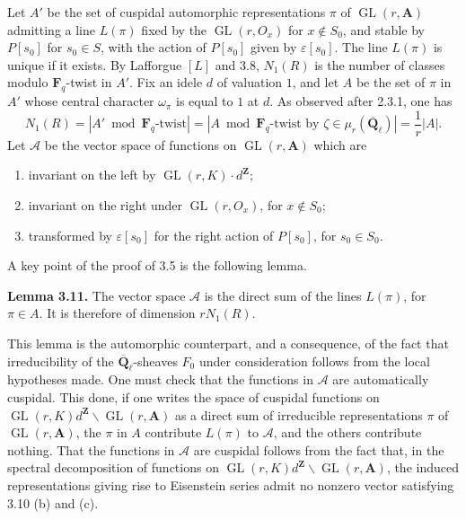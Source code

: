 \documentclass[11pt]{article}
\newcommand{\Qbar}{\overline{\mathbf Q}}
\newcommand{\Fq}{\mathbf F_q}
\newcommand{\Z}{\mathbf Z}
\newcommand{\A}{\mathbf A}
\newcommand{\GL}{\operatorname{GL}}
\begin{document}
Let \(A'\) be the set of cuspidal automorphic representations \(\pi\) of \(\GL(r,\A)\) admitting a line \(L(\pi)\) fixed by the \(\GL(r,O_x)\) for \(x\notin S_0\), and stable by \(P[s_0]\) for \(s_0\in S\), with the action of \(P[s_0]\) given by \(\varepsilon[s_0]\). The line \(L(\pi)\) is unique if it exists. By Lafforgue \([L]\) and 3.8, \(N_1(R)\) is the number of classes modulo \(\Fq\)-twist in \(A'\). Fix an idele \(d\) of valuation \(1\), and let \(A\) be the set of \(\pi\) in \(A'\) whose central character \(\omega_\pi\) is equal to \(1\) at \(d\). As observed after 2.3.1, one has
\begin{equation}\tag{3.9.1}
N_1(R)=|A'\bmod \Fq\text{-twist}|=|A\bmod \Fq\text{-twist by }\zeta\in\mu_r(\Qbar_\ell)|=\frac1r |A|.
\end{equation}
Let \(\mathcal A\) be the vector space of functions on \(\GL(r,\A)\) which are
\begin{enumerate}[label=(\alph*)]
\item invariant on the left by \(\GL(r,K)\cdot d^\Z\);
\item invariant on the right under \(\GL(r,O_x)\), for \(x\notin S_0\);
\item transformed by \(\varepsilon[s_0]\) for the right action of \(P[s_0]\), for \(s_0\in S_0\).
\end{enumerate}
A key point of the proof of 3.5 is the following lemma.

\textbf{Lemma 3.11.} The vector space \(\mathcal A\) is the direct sum of the lines \(L(\pi)\), for \(\pi\in A\). It is therefore of dimension \(rN_1(R)\).

This lemma is the automorphic counterpart, and a consequence, of the fact that irreducibility of the \(\Qbar_\ell\)-sheaves \(F_0\) under consideration follows from the local hypotheses made. One must check that the functions in \(\mathcal A\) are automatically cuspidal. This done, if one writes the space of cuspidal functions on \(\GL(r,K)d^\Z\backslash\GL(r,\A)\) as a direct sum of irreducible representations \(\pi\) of \(\GL(r,\A)\), the \(\pi\) in \(A\) contribute \(L(\pi)\) to \(\mathcal A\), and the others contribute nothing. That the functions in \(\mathcal A\) are cuspidal follows from the fact that, in the spectral decomposition of functions on \(\GL(r,K)d^\Z\backslash\GL(r,\A)\), the induced representations giving rise to Eisenstein series admit no nonzero vector satisfying 3.10 (b) and (c).
\end{document}
